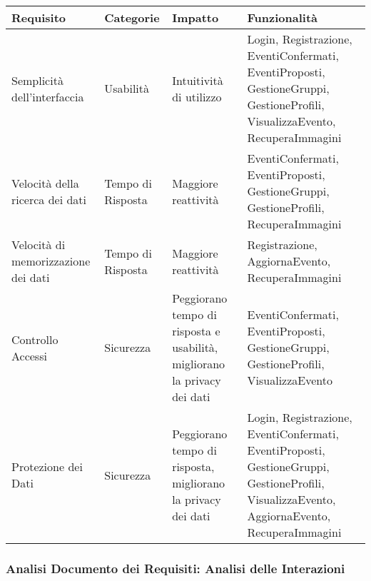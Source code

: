 \begin{tabular} {|P{4cm}|P{2.5cm}|P{3.5cm}|P{4.9cm}|}
    \hline
    \textbf{Requisito}                  & \textbf{Categorie} & \textbf{Impatto}                                                         & \textbf{Funzionalità}                                                                                                       \\
    \hline
    Semplicità dell'interfaccia         & Usabilità          & Intuitività di utilizzo                                                  & Login, Registrazione, EventiConfermati, EventiProposti, GestioneGruppi, GestioneProfili, VisualizzaEvento, RecuperaImmagini \\
    \hline
    Velocità della ricerca dei dati     & Tempo di Risposta  & Maggiore reattività                                                      & EventiConfermati, EventiProposti, GestioneGruppi, GestioneProfili, RecuperaImmagini                                         \\
    \hline
    Velocità di memorizzazione dei dati & Tempo di Risposta  & Maggiore reattività                                                      & Registrazione, AggiornaEvento, RecuperaImmagini                                                                             \\
    \hline
    Controllo Accessi                   & Sicurezza          & Peggiorano tempo di risposta e usabilità, migliorano la privacy dei dati & EventiConfermati, EventiProposti, GestioneGruppi, GestioneProfili, VisualizzaEvento                                                                                                                            \\
    \hline
    Protezione dei Dati                 & Sicurezza          & Peggiorano tempo di risposta, migliorano la privacy dei dati             & Login, Registrazione, EventiConfermati, EventiProposti, GestioneGruppi, GestioneProfili, VisualizzaEvento, AggiornaEvento, RecuperaImmagini                                                                                                                            \\
    \hline
\end{tabular}

\newpage

\subsubsection{Analisi Documento dei Requisiti: Analisi delle Interazioni}
\hfill \break

